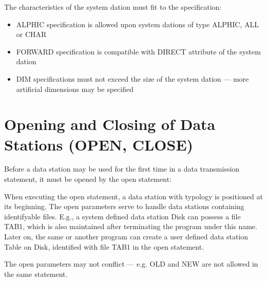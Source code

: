 The characteristics of the system dation must fit to the specification:
\begin{itemize}
\item ALPHIC specification is allowed upon system dations of type ALPHIC,
   ALL or CHAR
\item FORWARD specification is compatible with DIRECT attribute
   of the system dation
\item DIM specifications must not exceed the size of the system dation ---
      more artificial dimensions may be specified
\end{itemize}

\section{Opening and Closing of Data Stations (OPEN, CLOSE)}   %
\label{sec_open_close}

Before a data station may be used for the first time in a data
transmission statement, it must be opened by the open statement:



When executing the open statement, a data station with typology is
positioned at its beginning.
The open parameters serve to handle data stations containing
identifyable files. E.g., a system defined data station Disk can possess
a file TAB1, which is also maintained after terminating the program
under this name. Later on, the same or another program can create a user
defined data station Table on Disk, identified with file TAB1 in the
open statement.





The open parameters may not conflict --- e.g. OLD and NEW are not allowed
in the same statement.

